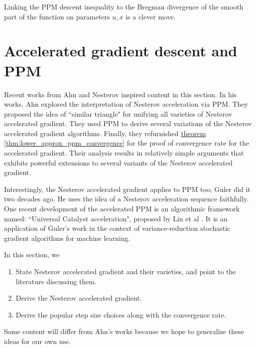 \documentclass[12pt]{article}
\begin{document}
        \begin{remark}
            Linking the PPM descent inequality to the Bregman divergence of the smooth part of the function on parameters $u, x$ is a clever move. 
        \end{remark}

        
\section{Accelerated gradient descent and PPM}
    Recent works from Ahn \cite{ahn_understanding_2022} and Nesterov \cite{nesterov_lectures_2018} inspired content in this section.
    In his works, Ahn explored the interpretation of Nesterov acceleration via PPM. 
    They proposed the idea of ``similar triangle" for unifying all varieties of Nesterov accelerated gradient. 
    They used PPM to derive several variations of the Nesterov accelerated gradient algorithms. 
    Finally, they refurnished \hyperref[thm:lower_approx_ppm_convergence]{theorem \ref*{thm:lower_approx_ppm_convergence}} for the proof of convergence rate for the accelerated gradient.
    Their analysis results in relatively simple arguments that exhibits powerful extensions to several variants of the Nesterov accelerated gradient. 
    \par\noindent
    Interestingly, the Nesterov accelerated gradient applies to PPM too; Guler \cite{guler_new_1992} did it two decades ago. 
    He uses the idea of a Nesterov acceleration sequence faithfully. 
    One recent development of the accelerated PPM is an algorithmic framework named: ``Universal Catalyst acceleration", proposed by Lin et al \cite{lin_universal_2015}. 
    It is an application of Guler's work in the context of variance-reduction stochastic gradient algorithms for machine learning. 
    \par\noindent
    In this section, we
    \begin{enumerate}
        \item State Nesterov accelerated gradient and their varieties, and point to the literature discussing them. 
        \item Derive the Nesterov accelerated gradient. 
        \item Derive the popular step size choices along with the convergence rate. 
    \end{enumerate}
    Some content will differ from Ahn's works because we hope to generalize these ideas for our own use. 
    
    
\end{document}
